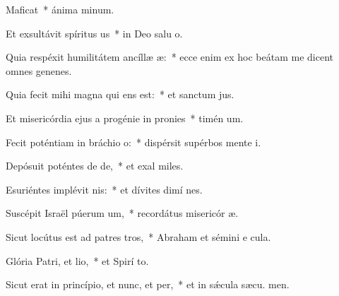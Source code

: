 \item Maficat~* ánima  minum.
\item Et exsultávit spíritus us~* in Deo salu o.
\item Quia respéxit humilitátem ancíllæ æ:~* ecce enim ex hoc beátam me dicent omnes genenes.
\item Quia fecit mihi magna qui ens est:~* et sanctum  jus.
\item Et misericórdia ejus a progénie in pronies~* timén um.
\item Fecit poténtiam in bráchio o:~* dispérsit supérbos mente  i.
\item Depósuit poténtes de de,~* et exal miles.
\item Esuriéntes implévit nis:~* et dívites dimí nes.
\item Suscépit Israël púerum um,~* recordátus misericór æ.
\item Sicut locútus est ad patres tros,~* Abraham et sémini e  cula.
\item Glória Patri, et lio,~* et Spirí to.
\item Sicut erat in princípio, et nunc, et per,~* et in sǽcula sæcu. men.
